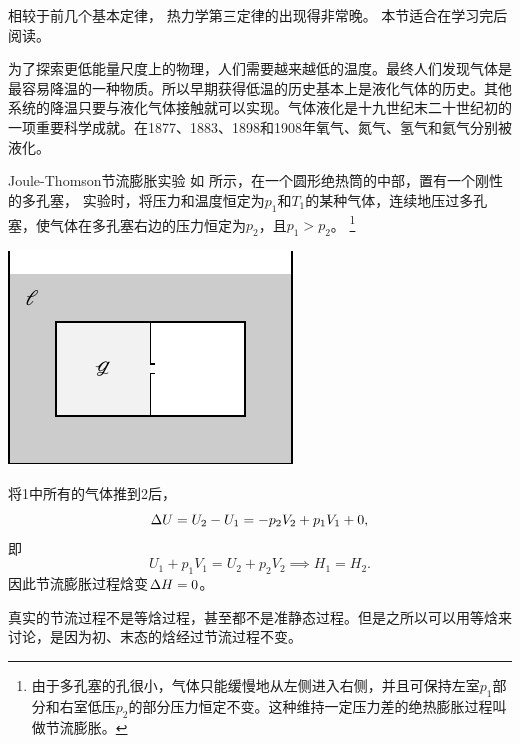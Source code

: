 相较于前几个基本定律，
热力学第三定律的出现得非常晚。
本节适合在学习完后阅读。


为了探索更低能量尺度上的物理，人们需要越来越低的温度。最终人们发现气体是最容易降温的一种物质。所以早期获得低温的历史基本上是液化气体的历史。其他系统的降温只要与液化气体接触就可以实现。气体液化是十九世纪末二十世纪初的一项重要科学成就。在1877、1883、1898和1908年氧气、氮气、氢气和氦气分别被液化。

\begin{example}
	{Joule-Thomson节流膨胀实验}{}
	如 所示，在一个圆形绝热筒的中部，置有一个刚性的多孔塞，
	实验时，将压力和温度恒定为$p_1$和$T_1$的某种气体，连续地压过多孔塞，使气体在多孔塞右边的压力恒定为$p_2$，且$p_1>p_2$。
	\footnote{由于多孔塞的孔很小，气体只能缓慢地从左侧进入右侧，并且可保持左室$p_1$部分和右室低压$p_2$的部分压力恒定不变。这种维持一定压力差的绝热膨胀过程叫做节流膨胀。}
	\begin{center}
		\includegraphics[page=2]{figures/tikz/layouts.pdf}
		\label{fig:Joule throttle expansion}
	\end{center}
	将1中所有的气体推到2后，
	\[
		\Delta U=U_2-U_1=-p_2V_2+p_1V_1+0,
	\]
	即
	\[
		U_1+p_1V_1=U_2+p_2V_2\implies H_1=H_2.
	\]
	因此节流膨胀过程焓变$\Delta H=0$。
\end{example}

\begin{remark}
	真实的节流过程不是等焓过程，甚至都不是准静态过程。但是之所以可以用等焓来讨论，是因为初、末态的焓经过节流过程不变。
\end{remark}

